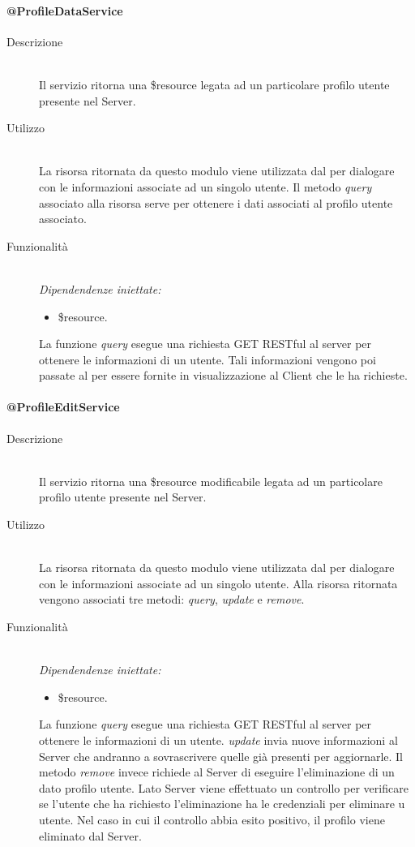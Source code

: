 \paragraph{@ProfileDataService}
\begin{description}
 \item[Descrizione] \hfill \\
 Il servizio ritorna una \$resource legata ad un particolare profilo utente presente nel Server.
 \item[Utilizzo] \hfill \\
 La risorsa ritornata da questo modulo viene utilizzata dal  per dialogare con le informazioni associate ad un singolo utente.
 Il metodo \textit{query} associato alla risorsa serve per ottenere i dati associati al profilo utente associato.
 \item[Funzionalità] \hfill \\
 \emph{Dipendendenze iniettate:}
 \begin{itemize}
  \item \$resource.
 \end{itemize}
 La funzione \textit{query} esegue una richiesta GET RESTful al server per ottenere le informazioni di un utente. Tali informazioni vengono 
 poi passate al  per essere fornite in visualizzazione al Client che le ha richieste.
\end{description}

\paragraph{@ProfileEditService}
\begin{description}
 \item[Descrizione] \hfill \\
 Il servizio ritorna una \$resource modificabile legata ad un particolare profilo utente presente nel Server.
 \item[Utilizzo] \hfill \\
 La risorsa ritornata da questo modulo viene utilizzata dal  per dialogare con le informazioni associate ad un singolo utente.
 Alla risorsa ritornata vengono associati tre metodi: \textit{query}, \textit{update} e \textit{remove}.
 \item[Funzionalità] \hfill \\
 \emph{Dipendendenze iniettate:}
 \begin{itemize}
  \item \$resource.
 \end{itemize}
 La funzione \textit{query} esegue una richiesta GET RESTful al server per ottenere le informazioni di un utente. \textit{update} invia 
 nuove informazioni al Server che andranno a sovrascrivere quelle già presenti per aggiornarle. Il metodo \textit{remove} invece richiede al 
 Server di eseguire l'eliminazione di un dato profilo utente. Lato Server viene effettuato un controllo per verificare se l'utente che 
 ha richiesto l'eliminazione ha le credenziali per eliminare u utente. Nel caso in cui il controllo abbia esito positivo, il profilo
 viene eliminato dal Server.
\end{description}

